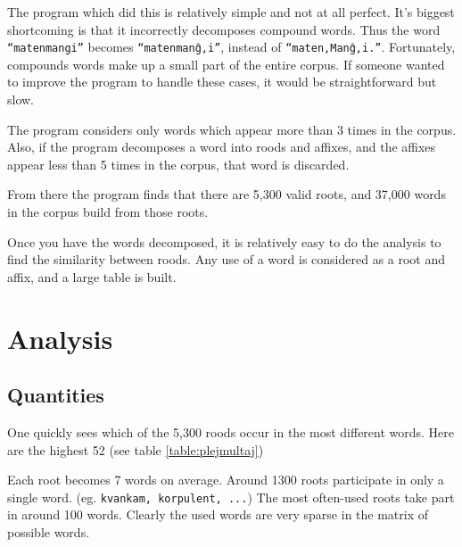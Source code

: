 \documentclass[12pt,twoside]{article}
\begin{document}
The program which did this is relatively simple and not at all perfect. It's biggest shortcoming is that it 
incorrectly decomposes compound words. Thus the word \texttt{``matenmangi''} becomes \texttt{``matenmanĝ,i''}, instead of 
\texttt{``maten,Manĝ,i.''}. Fortunately, compounds words make up a small part of the entire corpus. If someone wanted
to improve the program to handle these cases, it would be straightforward but slow.

The program considers only words which appear more than 3 times in the corpus. Also, if the program decomposes a word 
into roods and affixes, and the affixes appear less than 5 times in the corpus, that word is discarded.

From there the program finds that there are 5,300 valid roots, and 37,000 words in the corpus build from those roots.

Once you have the words decomposed, it is relatively easy to do the analysis to find the similarity between roods.
Any use of a word is considered as a root and affix, and a large table is built.

\section{Analysis}
\subsection{Quantities}

One quickly sees which of the 5,300 roods occur in the most different words. Here are the highest 52 (see table \ref{table:plejmultaj})

Each root becomes 7 words on average. Around 1300 roots participate in only a single word. (eg. \texttt{kvankam, korpulent, ...})
The most often-used roots take part in around 100 words. Clearly the used words are very sparse in the matrix of possible words.
\end{document}
